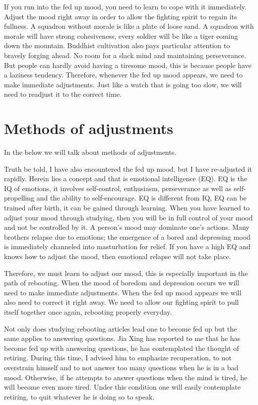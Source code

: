 \documentclass[
]{book}
\begin{document}
If you run into the fed up mood, you need to learn to cope with it immediately. Adjust the mood right away in order to allow the fighting spirit to regain its fullness. A squadron without morale is like a plate of loose sand. A squadron with morale will have strong cohesiveness, every soldier will be like a tiger coming down the mountain. Buddhist cultivation also pays particular attention to bravely forging ahead. No room for a slack mind and maintaining perseverance. But people can hardly avoid having a tiresome mood, this is because people have a laziness tendency. Therefore, whenever the fed up mood appears, we need to make immediate adjustments. Just like a watch that is going too slow, we will need to readjust it to the correct time.

\hypertarget{methods-of-adjustments}{%
\section{Methods of adjustments}\label{methods-of-adjustments}}

In the below we will talk about methods of adjustments.

Truth be told, I have also encountered the fed up mood, but I have re-adjusted it rapidly. Herein lies a concept and that is emotional intelligence (EQ). EQ is the IQ of emotions, it involves self-control, enthusiasm, perseverance as well as self-propelling and the ability to self-encourage. EQ is different from IQ, EQ can be trained after birth, it can be gained through learning. When you have learned to adjust your mood through studying, then you will be in full control of your mood and not be controlled by it. A person's mood may dominate one's actions. Many brothers relapse due to emotions; the emergence of a bored and depressing mood is immediately channeled into masturbation for relief. If you have a high EQ and knows how to adjust the mood, then emotional relapse will not take place.

Therefore, we must learn to adjust our mood, this is especially important in the path of rebooting. When the mood of boredom and depression occurs we will need to make immediate adjustments. When the fed up mood appears we will also need to correct it right away. We need to allow our fighting spirit to pull itself together once again, rebooting properly everyday.

Not only does studying rebooting articles lead one to become fed up but the same applies to answering questions. Jia Xing has reported to me that he has become fed up with answering questions, he has contemplated the thought of retiring. During this time, I advised him to emphasize recuperation, to not overstrain himself and to not answer too many questions when he is in a bad mood. Otherwise, if he attempts to answer questions when the mind is tired, he will become even more tired. Under this condition one will easily contemplate retiring, to quit whatever he is doing so to speak.
\end{document}
